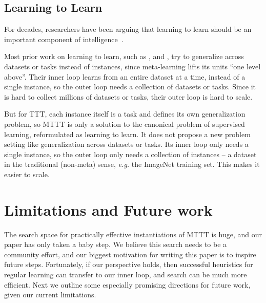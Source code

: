 \documentclass{article} %
\begin{document}

\subsection{Learning to Learn}


For decades, researchers have been arguing that learning to learn should be an important component of intelligence~\citep{schmidhuber1987evolutionary, bengio1990learning, thrun1998learning, lake2017building}.

Most prior work on learning to learn, such as \cite{andrychowicz2016learning}, \cite{finn2017model} and \cite{metz2018meta}, try to generalize across datasets or tasks instead of instances, since meta-learning lifts its units ``one level above''.
Their inner loop learns from an entire dataset at a time, instead of a single instance, so the outer loop needs a collection of datasets or tasks.
Since it is hard to collect millions of datasets or tasks, their outer loop is hard to scale.

But for TTT, each instance itself is a task and defines its own generalization problem, so MTTT is only a solution to the canonical problem of supervised learning, reformulated as learning to learn.
It does not propose a new problem setting like generalization across datasets or tasks.
Its inner loop only needs a single instance, so the outer loop only needs a collection of instances -- a dataset in the traditional (non-meta) sense, \textit{e.g.} the ImageNet training set.
This makes it easier to scale.



\section{Limitations and Future work}
The search space for practically effective instantiations of MTTT is huge, and our paper has only taken a baby step.
We believe this search needs to be a community effort, and our biggest motivation for writing this paper is to inspire future steps.
Fortunately, if our perspective holds, then successful heuristics for regular learning can transfer to our inner loop, and search can be much more efficient.
Next we outline some especially promising directions for future work, given our current limitations.
\end{document}
